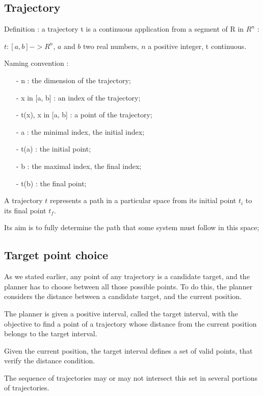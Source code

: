 \subsection{Trajectory}

Definition : a trajectory t is a continuous application from a segment of R in $R^n$ :
\newline

$t : [a, b] -> R^n$, $a$ and $b$ two real numbers, $n$ a positive integer, t continuous.
\newline

Naming convention : 
\begin{itemize}
\item [-] n : the dimension of the trajectory;
\item [-] x in [a, b] : an index of the trajectory;
\item [-] t(x), x in [a, b] : a point of the trajectory;
\item [-] a : the minimal index, the initial index;
\item [-] t(a) : the initial point;
\item [-] b : the maximal index, the final index;
\item [-] t(b) : the final point;
\newline
\end{itemize}

A trajectory $t$ represents a path in a particular space from its initial point $t_i$ to its final point 
$t_f$.

Its aim is to fully determine the path that some system must follow in this space;


\subsection{Target point choice}

As we stated earlier, any point of any trajectory is a candidate target, and the planner has to choose 
between all those possible points.
To do this, the planner considers the distance between a candidate target, and the current position.

The planner is given a positive interval, called the target interval, with the objective to
find a point of a trajectory whose distance from the current position belongs to the target interval.

Given the current position, the target interval defines a set of valid points, that verify the distance 
condition. 

The sequence of trajectories may or may not intersect this set in several portions of trajectories.


